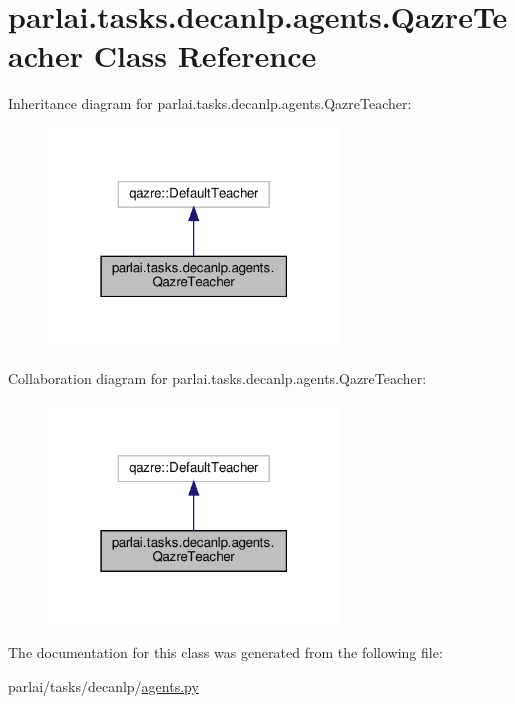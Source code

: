 \hypertarget{classparlai_1_1tasks_1_1decanlp_1_1agents_1_1QazreTeacher}{}\section{parlai.\+tasks.\+decanlp.\+agents.\+Qazre\+Teacher Class Reference}
\label{classparlai_1_1tasks_1_1decanlp_1_1agents_1_1QazreTeacher}


Inheritance diagram for parlai.\+tasks.\+decanlp.\+agents.\+Qazre\+Teacher\+:
\nopagebreak
\begin{figure}[H]
\begin{center}
\leavevmode
\includegraphics[width=219pt]{classparlai_1_1tasks_1_1decanlp_1_1agents_1_1QazreTeacher__inherit__graph}
\end{center}
\end{figure}


Collaboration diagram for parlai.\+tasks.\+decanlp.\+agents.\+Qazre\+Teacher\+:
\nopagebreak
\begin{figure}[H]
\begin{center}
\leavevmode
\includegraphics[width=219pt]{classparlai_1_1tasks_1_1decanlp_1_1agents_1_1QazreTeacher__coll__graph}
\end{center}
\end{figure}


The documentation for this class was generated from the following file\+:\begin{DoxyCompactItemize}
\item 
parlai/tasks/decanlp/\hyperlink{parlai_2tasks_2decanlp_2agents_8py}{agents.\+py}\end{DoxyCompactItemize}
